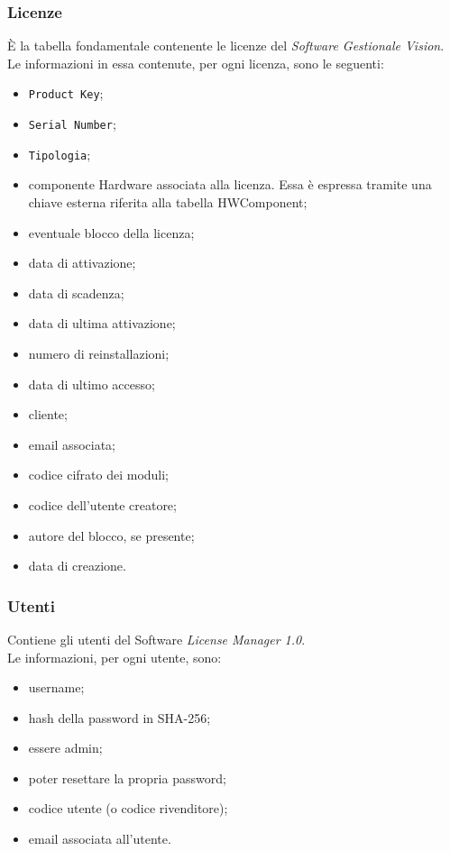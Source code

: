 \subsubsection{Licenze}
È la tabella fondamentale contenente le licenze del \textit{Software Gestionale Vision}. \\Le informazioni in essa contenute, per ogni licenza, sono le seguenti:

\begin{itemize}
\item \texttt{Product Key};
\item \texttt{Serial Number};
\item \texttt{Tipologia};
\item componente Hardware associata alla licenza. Essa è espressa tramite una chiave esterna riferita alla tabella HWComponent;
\item eventuale blocco della licenza;
\item data di attivazione;
\item data di scadenza;
\item data di ultima attivazione;
\item numero di reinstallazioni;
\item data di ultimo accesso;
\item cliente;
\item email associata;
\item codice cifrato dei moduli;
\item codice dell'utente creatore;
\item autore del blocco, se presente;
\item data di creazione.
\end{itemize}

\subsubsection{Utenti}

Contiene gli utenti del Software \textit{License Manager 1.0}.\\ Le informazioni, per ogni utente, sono:

\begin{itemize}
\item username;
\item hash della password in \gls{SHA-256};
\item essere admin;
\item poter resettare la propria password;
\item codice utente (o codice rivenditore);
\item email associata all'utente.
\end{itemize} 

